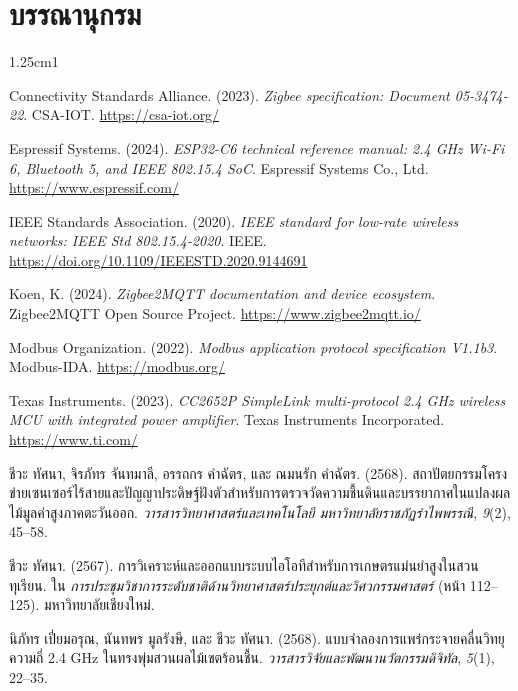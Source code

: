 \chapter*{บรรณานุกรม}

\begin{hangparas}{1.25cm}{1}

Connectivity Standards Alliance. (2023). \textit{Zigbee specification: Document 05-3474-22}. CSA-IOT. \url{https://csa-iot.org/}

Espressif Systems. (2024). \textit{ESP32-C6 technical reference manual: 2.4 GHz Wi-Fi 6, Bluetooth 5, and IEEE 802.15.4 SoC}. Espressif Systems Co., Ltd. \url{https://www.espressif.com/}

IEEE Standards Association. (2020). \textit{IEEE standard for low-rate wireless networks: IEEE Std 802.15.4-2020}. IEEE. \url{https://doi.org/10.1109/IEEESTD.2020.9144691}

Koen, K. (2024). \textit{Zigbee2MQTT documentation and device ecosystem}. Zigbee2MQTT Open Source Project. \url{https://www.zigbee2mqtt.io/}

Modbus Organization. (2022). \textit{Modbus application protocol specification V1.1b3}. Modbus-IDA. \url{https://modbus.org/}

Texas Instruments. (2023). \textit{CC2652P SimpleLink multi-protocol 2.4 GHz wireless MCU with integrated power amplifier}. Texas Instruments Incorporated. \url{https://www.ti.com/}

ชีวะ ทัศนา, จิรภัทร จันทมาลี, อรรถกร คำฉัตร, และ ณมนรัก คำฉัตร. (2568). สถาปัตยกรรมโครงข่ายเซนเซอร์ไร้สายและปัญญาประดิษฐ์ฝังตัวสำหรับการตรวจวัดความชื้นดินและบรรยากาศในแปลงผลไม้มูลค่าสูงภาคตะวันออก. \textit{วารสารวิทยาศาสตร์และเทคโนโลยี มหาวิทยาลัยราชภัฏรำไพพรรณี}, \textit{9}(2), 45--58.

ชีวะ ทัศนา. (2567). การวิเคราะห์และออกแบบระบบไอโอทีสำหรับการเกษตรแม่นยำสูงในสวนทุเรียน. ใน \textit{การประชุมวิชาการระดับชาติด้านวิทยาศาสตร์ประยุกต์และวิศวกรรมศาสตร์} (หน้า 112--125). มหาวิทยาลัยเชียงใหม่.

นิภัทร เปี่ยมอรุณ, นันทพร มูลรังษี, และ ชีวะ ทัศนา. (2568). แบบจำลองการแพร่กระจายคลื่นวิทยุความถี่ 2.4 GHz ในทรงพุ่มสวนผลไม้เขตร้อนชื้น. \textit{วารสารวิจัยและพัฒนานวัตกรรมดิจิทัล}, \textit{5}(1), 22--35.

\end{hangparas}

\clearpage

